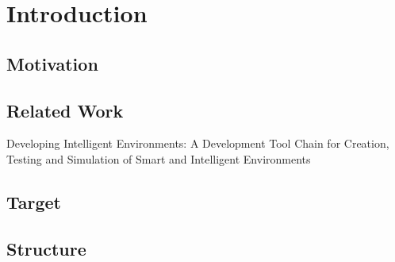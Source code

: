 \chapter{Introduction}\label{ch:introduction}

\section{Motivation}\label{sec:motivation}
\section{Related Work}\label{sec:related-work}
Developing Intelligent Environments: A Development Tool Chain for Creation, Testing and Simulation of Smart and Intelligent Environments\cite{roalter2011developing}
\section{Target}\label{sec:target}
\section{Structure}\label{sec:structure}

